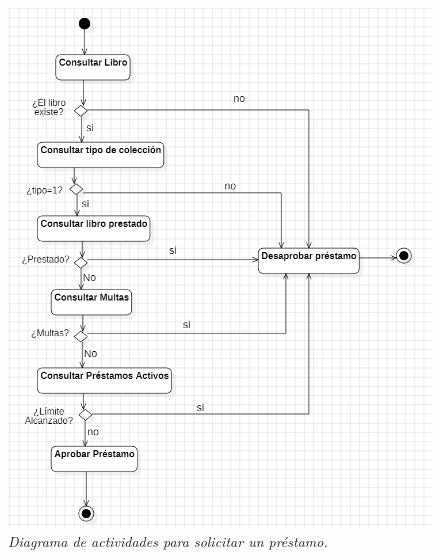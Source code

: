 \documentclass[spanish]{ieee_upb}
\begin{document}
 \begin{figure}[H] 
	\centering
	\includegraphics[width=0.7\linewidth]{img/diagramaActividadesSolicitud.png}
	\vspace{-1mm}
	\caption[Diagrama de Actividades para solicitar un préstamo]{\textit{Diagrama de actividades para solicitar un préstamo.}}
	\label{fig:actividadesSolPrestamo} 
\end{figure}
\end{document}
